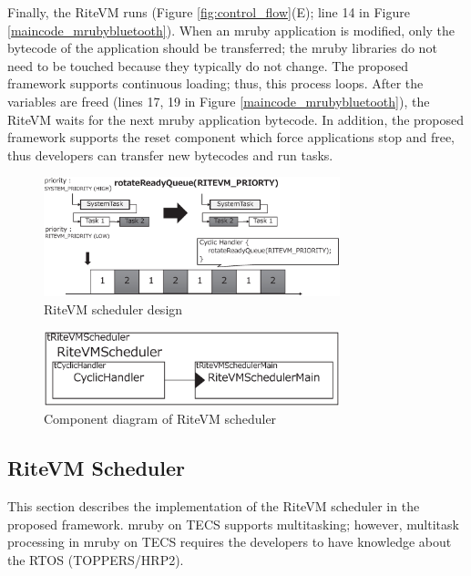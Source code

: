 \documentclass[conference]{IEEEtran/IEEEtran/IEEEtran}
\begin{document}
Finally, the RiteVM runs (Figure \ref{fig:control_flow}(E); line 14 in Figure \ref{maincode_mrubybluetooth}).
When an mruby application is modified, only the bytecode of the application should be transferred; the mruby libraries do not need to be touched because they typically do not change.
The proposed framework supports continuous loading; thus, this process loops.
After the variables are freed (lines 17, 19 in Figure \ref{maincode_mrubybluetooth}), the RiteVM waits for the next mruby application bytecode.
In addition, the proposed framework supports the reset component which force applications stop and free, thus developers can transfer new bytecodes and run tasks.

\begin{figure}[t]
    \centering
    \includegraphics[width=8.6cm,clip]{figure/rotateReadyQueue.eps}
    \vspace{-3mm}
\caption{RiteVM scheduler design}
    \vspace{-3mm}
\label{fig:rotateReadyQueue}
\end{figure} 

\begin{figure}[t]
    \centering
    \includegraphics[width=8.6cm,clip]{figure/cyclic_handler.eps}
    \vspace{-3mm}
\caption{Component diagram of RiteVM scheduler}
    \vspace{-3mm}
\label{fig:cyclic_handler}
\end{figure}

\subsection{RiteVM Scheduler}
\label{sec:RiteVM Scheduler}
This section describes the implementation of the RiteVM scheduler in the proposed framework.
mruby on TECS supports multitasking; however, multitask processing in mruby on TECS requires the developers to have knowledge about the RTOS (TOPPERS/HRP2).
\end{document}
